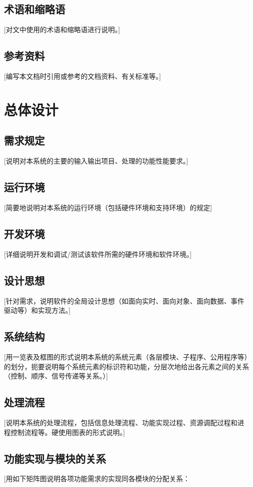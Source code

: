 \documentclass[12pt,a4paper,UTF-8]{ctexart}
\begin{document}
	\subsection{术语和缩略语}
		[对文中使用的术语和缩略语进行说明。]
	
	\subsection{参考资料}
		[编写本文档时引用或参考的文档资料、有关标准等。]
\section{总体设计}
	\subsection{需求规定}
		[说明对本系统的主要的输入输出项目、处理的功能性能要求。]
	\subsection{运行环境}
		[简要地说明对本系统的运行环境（包括硬件环境和支持环境）的规定]
	\subsection{开发环境}
		[详细说明开发和调试/测试该软件所需的硬件环境和软件环境。]
	\subsection{设计思想}
		[针对需求，说明软件的全局设计思想（如面向实时、面向对象、面向数据、事件驱动等）和实现方法。]
	\subsection{系统结构}
		[用一览表及框图的形式说明本系统的系统元素（各层模块、子程序、公用程序等）的划分，扼要说明每个系统元素的标识符和功能，分层次地给出各元素之间的关系（控制、顺序、信号传递等关系。）]
	\subsection{处理流程}
		[说明本系统的处理流程，包括信息处理流程、功能实现过程、资源调配过程和进程控制流程等。硬使用图表的形式说明。]
	\subsection{功能实现与模块的关系}
		[用如下矩阵图说明各项功能需求的实现同各模块的分配关系：
\end{document}
